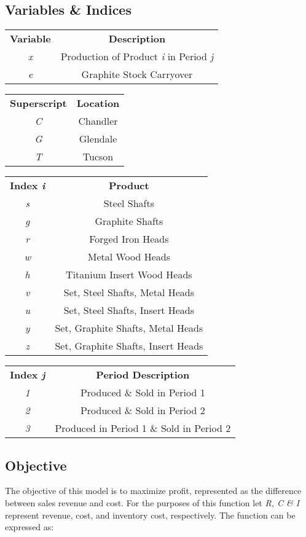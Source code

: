 \documentclass{article}
\begin{document}
\subsection{Variables \& Indices}
\begin{tabular}{ c c }
\textbf{Variable} & \textbf{Description} \\
\textit{x} & Production of Product \textit{i} in Period \textit{j} \\
\textit{e} & Graphite Stock Carryover \\
\end{tabular}

\begin{tabular}{ c c }
\textbf{Superscript} & \textbf{Location} \\
\textit{C} & Chandler \\
\textit{G} & Glendale \\
\textit{T} & Tucson \\
\end{tabular}

\begin{tabular}{ c c }
\textbf{Index \textit{i}} & \textbf{Product} \\
\textit{s} & Steel Shafts \\
\textit{g} & Graphite Shafts \\
\textit{r} & Forged Iron Heads \\
\textit{w} & Metal Wood Heads \\
\textit{h} & Titanium Insert Wood Heads \\
\textit{v} & Set, Steel Shafts, Metal Heads \\
\textit{u} & Set, Steel Shafts, Insert Heads \\
\textit{y} & Set, Graphite Shafts, Metal Heads \\
\textit{z} & Set, Graphite Shafts, Insert Heads \\
\end{tabular}
\begin{tabular}{ c c }
\textbf{Index \textit{j}} & \textbf{Period Description} \\
\textit{1} & Produced \& Sold in Period 1 \\
\textit{2} & Produced \& Sold in Period 2 \\
\textit{3} & Produced in Period 1 \& Sold in Period 2 \\
\end{tabular}

\subsection{Objective}
The objective of this model is to maximize profit, represented as the difference between sales revenue and cost.  For the purposes of this function let \textit{R, C \& I} represent revenue, cost, and inventory cost, respectively.  The function can be expressed as:
\end{document}
